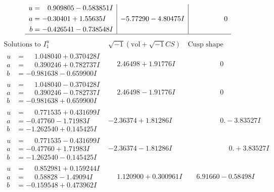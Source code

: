 \documentclass[1p]{elsarticle_modified}
\theoremstyle{definition}
\newcommand{\I}{\sqrt{-1}}
\begin{document}
$$\begin{array}{c|c|c}
\begin{aligned}
u &= \phantom{-}0.909805 - 0.583851 I \\
a &= -0.30401 + 1.55635 I \\
b &= -0.426541 - 0.738548 I\end{aligned}
 & -5.77290 - 4.80475 I & \phantom{-0.000000 } 0\\
 \hline 
 \end{array}$$\newpage$$\begin{array}{c|c|c}  
\text{Solutions to }I^u_{1}& \I (\text{vol} + \sqrt{-1}CS) & \text{Cusp shape}\\
 \hline 
\begin{aligned}
u &= \phantom{-}1.048040 + 0.370428 I \\
a &= \phantom{-}0.390246 + 0.782737 I \\
b &= -0.981638 - 0.659900 I\end{aligned}
 & \phantom{-}2.46498 + 1.91776 I & \phantom{-0.000000 } 0 \\ \hline\begin{aligned}
u &= \phantom{-}1.048040 - 0.370428 I \\
a &= \phantom{-}0.390246 - 0.782737 I \\
b &= -0.981638 + 0.659900 I\end{aligned}
 & \phantom{-}2.46498 - 1.91776 I & \phantom{-0.000000 } 0 \\ \hline\begin{aligned}
u &= \phantom{-}0.771535 + 0.431699 I \\
a &= -0.47760 - 1.71983 I \\
b &= -1.262540 + 0.145425 I\end{aligned}
 & -2.36374 + 1.81286 I & \phantom{-0.000000 } 0. - 3.83527 I \\ \hline\begin{aligned}
u &= \phantom{-}0.771535 - 0.431699 I \\
a &= -0.47760 + 1.71983 I \\
b &= -1.262540 - 0.145425 I\end{aligned}
 & -2.36374 - 1.81286 I & \phantom{-0.000000 -}0. + 3.83527 I \\ \hline\begin{aligned}
u &= \phantom{-}0.852981 + 0.159244 I \\
a &= \phantom{-}0.58828 - 1.49094 I \\
b &= -0.159548 + 0.473962 I\end{aligned}
 & \phantom{-}1.120900 + 0.300961 I & \phantom{-}6.91660 - 0.58498 I \\ \hline\begin{aligned}

\end{aligned}
\end{array}$$
\end{document}
